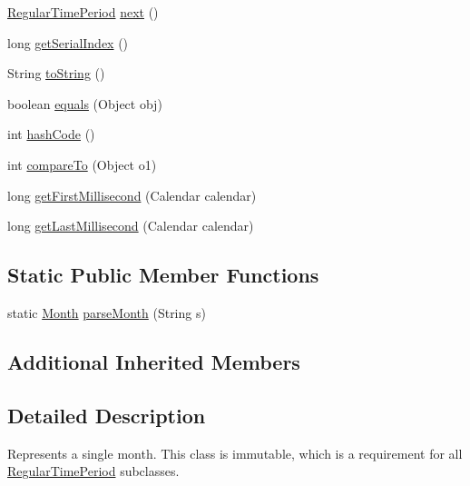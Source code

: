 \begin{DoxyCompactItemize}
\item 
\mbox{\hyperlink{classorg_1_1jfree_1_1data_1_1time_1_1_regular_time_period}{Regular\+Time\+Period}} \mbox{\hyperlink{classorg_1_1jfree_1_1data_1_1time_1_1_month_a9865e73c91ab8fc3209c12c59442361e}{next}} ()
\item 
long \mbox{\hyperlink{classorg_1_1jfree_1_1data_1_1time_1_1_month_abb6ff67c83a4632db945b24bef2ab1b5}{get\+Serial\+Index}} ()
\item 
String \mbox{\hyperlink{classorg_1_1jfree_1_1data_1_1time_1_1_month_a531787416446452254611779b899dac1}{to\+String}} ()
\item 
boolean \mbox{\hyperlink{classorg_1_1jfree_1_1data_1_1time_1_1_month_a6c833a50086bd0c892020f0c3ab9fdfd}{equals}} (Object obj)
\item 
int \mbox{\hyperlink{classorg_1_1jfree_1_1data_1_1time_1_1_month_ae95408b4de2c690ac58c09c9efe72b5b}{hash\+Code}} ()
\item 
int \mbox{\hyperlink{classorg_1_1jfree_1_1data_1_1time_1_1_month_aa3d347a26293c0b2909f2c1061ef0f95}{compare\+To}} (Object o1)
\item 
long \mbox{\hyperlink{classorg_1_1jfree_1_1data_1_1time_1_1_month_a5e63ba287f7ebce364099d82cbe393b6}{get\+First\+Millisecond}} (Calendar calendar)
\item 
long \mbox{\hyperlink{classorg_1_1jfree_1_1data_1_1time_1_1_month_af95f6d9661ea0175063ae3387d160512}{get\+Last\+Millisecond}} (Calendar calendar)
\end{DoxyCompactItemize}
\subsection*{Static Public Member Functions}
\begin{DoxyCompactItemize}
\item 
static \mbox{\hyperlink{classorg_1_1jfree_1_1data_1_1time_1_1_month}{Month}} \mbox{\hyperlink{classorg_1_1jfree_1_1data_1_1time_1_1_month_ac39920155addf2045d3fb8ef877855c4}{parse\+Month}} (String s)
\end{DoxyCompactItemize}
\subsection*{Additional Inherited Members}


\subsection{Detailed Description}
Represents a single month. This class is immutable, which is a requirement for all \mbox{\hyperlink{classorg_1_1jfree_1_1data_1_1time_1_1_regular_time_period}{Regular\+Time\+Period}} subclasses. 

